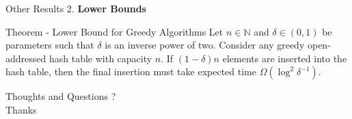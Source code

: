 \documentclass{beamer}
\begin{document}
\begin{frame}{Other Results}
	2. {\bf Lower Bounds}
	\begin{block}{Theorem - Lower Bound for Greedy Algorithms}
			Let $n \in \mathbb{N}$ and $\delta \in(0, 1)$ be parameters such that $\delta$ is an inverse power of two. Consider any greedy open-addressed hash table with capacity $n$. If $(1-\delta)n$ elements are inserted into the hash table, then the final insertion must take expected time $\Omega(\log^2{\delta^{-1}})$.
	\end{block}
\end{frame}



\begin{frame}
\begin{center}
{\sc \LARGE Thoughts and Questions ?} \\
\vspace{3cm}
{\sc \large Thanks} 
\end{center}
\end{frame}




%
\end{document}
